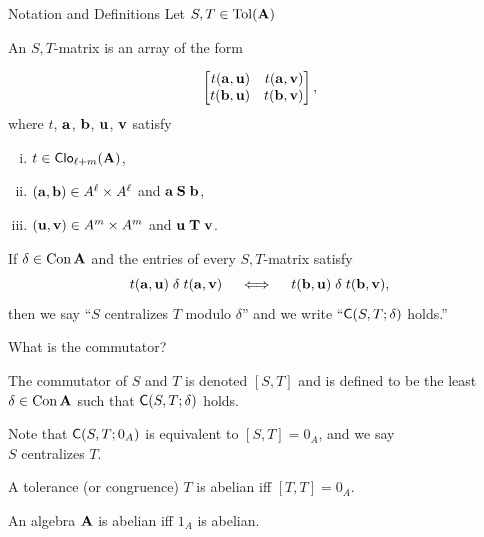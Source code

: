 \documentclass[notes=hide,12pt,xcolor=dvipsnames%
   ]{beamer}
\renewcommand{\defn}[1]{\alert{#1}}
\newcommand{\defin}[1]{\alert{#1}}
\newcommand{\medpause}{\pause\medskip}
\theoremstyle{definition}
\begin{document}
\begin{frame}[shrink=10,label=defs]{Notation and Definitions}%
  Let $S, T \in \operatorname{Tol}(\mathbf{A})$

  An \defin{$S,T$-matrix} is an array of the form

  \[
  \begin{bmatrix*}[r] t(\ba,\bu) & t(\ba,\bv)\\ t(\bb,\bu)&t(\bb,\bv)\end{bmatrix*},
  \]
  where $t$, $\mathbf{a}$, $\mathbf{b}$, $\mathbf{u}$, $\mathbf{v}$ satisfy
  \begin{enumerate}[(i)] %
  \item $t\in \operatorname{\mathsf{Clo}}_{\ell + m}(\mathbf{A})$,
  \item $(\mathbf{a}, \mathbf{b})\in A^\ell\times A^\ell$ and $\mathbf{a} \mathrel{\mathbf{S}} \mathbf{b}$,
  \item $(\mathbf{u}, \mathbf{v})\in A^m\times A^m$ and $\mathbf{u} \mathrel{\mathbf{T}} \mathbf{v}$.
  \end{enumerate}
\pause
  If $\delta \in \operatorname{Con} \mathbf{A}$ and the entries of every $S,T$-matrix satisfy
  \begin{equation}
    \label{eq:22}
    t(\mathbf{a},\mathbf{u}) \mathrel{\delta} t(\mathbf{a},\mathbf{v})\quad \iff \quad t(\mathbf{b},\mathbf{u}) \mathrel{\delta} t(\mathbf{b},\mathbf{v}),
  \end{equation}
  then we say ``\defn{$S$ centralizes $T$ modulo $\delta$}'' and we write
  ``$\mathsf{C}(S, T; \delta)$ holds.''
\end{frame}


\begin{frame}[label=defs]{What is the commutator?}

  The \defin{commutator of $S$ and $T$} is denoted $[S, T]$ and is defined to be
  the least $\delta\in \operatorname{Con}\mathbf{A}$ such that $\mathsf{C}(S, T; \delta)$ holds.  

  \medpause
  
  Note that $\mathsf{C}(S, T; 0_A)$ is equivalent to $[S,T] = 0_A$,
  and we say\\[4pt] \defn{$S$ centralizes $T$}.

  \medpause
  
  A tolerance (or congruence) $T$ is \defin{abelian} iff $[T, T] = 0_A$.  

  An algebra $\mathbf{A}$ is \defin{abelian} iff $1_A$ is abelian.
\end{frame}
\end{document}
